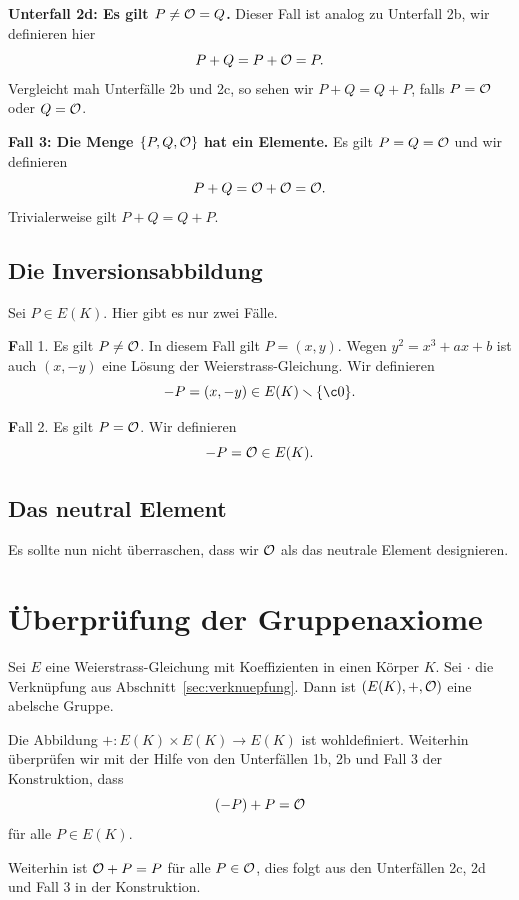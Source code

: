 \textbf{Unterfall 2d: Es gilt $P\not={\mathcal O}=Q$.}
Dieser Fall ist analog zu Unterfall 2b, wir definieren hier
\begin{equation*}
  P+Q = P+{\mathcal O} = P. 
\end{equation*}
Vergleicht mah Unterfälle 2b und 2c, so sehen wir $P+Q=Q+P$, falls
$P={\mathcal O}$ oder $Q={\mathcal O}$. 


\medskip
\textbf{Fall 3: Die Menge $\{P,Q,{\mathcal O}\}$ hat ein Elemente.} Es gilt
$P=Q={\mathcal O}$ und wir definieren
\begin{equation*}
  P+Q = {\mathcal O}+{\mathcal O} = {\mathcal O}. 
\end{equation*}
Trivialerweise gilt $P+Q=Q+P$. 

\subsection{Die Inversionsabbildung}

Sei $P\in E(K)$. Hier gibt es nur zwei Fälle.

{\textbf Fall 1. Es gilt $P\not={\mathcal O}$.} In diesem Fall gilt $P=(x,y)$.
Wegen $y^2 = x^3+ax+b$ ist auch $(x,-y)$ eine Lösung der Weierstrass-Gleichung.
Wir  definieren
$$
-P = (x,-y)\in E(K)\ssm\{\c0\}.
$$

{\textbf Fall 2. Es gilt $P={\mathcal O}$.} 
Wir  definieren
$$
-P = {\mathcal O} \in E(K).
$$

\subsection{Das neutral Element}
Es sollte nun nicht überraschen, dass wir ${\mathcal O}$ als das neutrale
Element designieren.

\section{Überprüfung der Gruppenaxiome}

\begin{satz}
  Sei $E$ eine Weierstrass-Gleichung mit Koeffizienten in einen Körper
  $K$. Sei $\cdot$ die Verknüpfung aus
  Abschnitt~\ref{sec:verknuepfung}.
  Dann ist $(E(K),+,{\mathcal O})$ eine abelsche Gruppe. 
\end{satz}

Die Abbildung $+\colon E(K)\times E(K) \rightarrow E(K)$ ist
wohldefiniert. Weiterhin überprüfen wir mit der Hilfe von den  Unterfällen
1b, 2b und Fall 3 der Konstruktion, dass
$$  (-P)+P = {\mathcal O}$$
für alle $P\in E(K)$.

Weiterhin ist ${\mathcal O} + P = P $ für alle $P\in {\mathcal O}$, dies folgt aus den
Unterfällen 2c, 2d und Fall 3 in der Konstruktion. 

